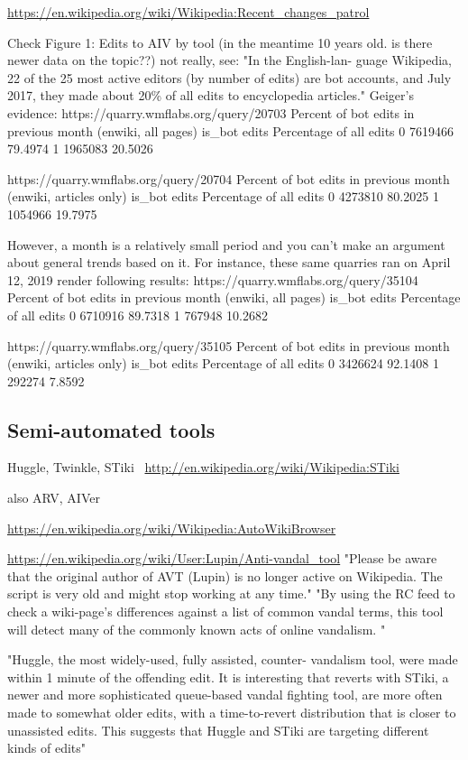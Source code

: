 \url{https://en.wikipedia.org/wiki/Wikipedia:Recent_changes_patrol}

\cite{GeiRib2010}
Check Figure 1: Edits to AIV by tool (in the meantime 10 years old. is there newer data on the topic??)
not really, see:
\cite{Geiger2017}
"In the English-lan-
guage Wikipedia, 22 of the 25 most active editors (by
number of edits) are bot accounts, and July 2017, they
made about 20\% of all edits to encyclopedia articles."
Geiger's evidence:
https://quarry.wmflabs.org/query/20703
Percent of bot edits in previous month (enwiki, all pages)
is_bot	edits	Percentage of all edits
0	    7619466	79.4974
1	    1965083	20.5026

https://quarry.wmflabs.org/query/20704
Percent of bot edits in previous month (enwiki, articles only)
is_bot	edits	Percentage of all edits
0	    4273810	80.2025
1	    1054966	19.7975

However, a month is a relatively small period and you can't make an argument about general trends based on it.
For instance, these same quarries ran on April 12, 2019 render following results:
https://quarry.wmflabs.org/query/35104
Percent of bot edits in previous month (enwiki, all pages)
is_bot	edits	Percentage of all edits
0	    6710916	89.7318
1	    767948	10.2682

https://quarry.wmflabs.org/query/35105
Percent of bot edits in previous month (enwiki, articles only)
is_bot	edits	Percentage of all edits
0	    3426624	92.1408
1	    292274	7.8592

\subsection{Semi-automated tools}


Huggle, Twinkle, STiki~\cite{WestKanLee2010}
\url{http://en.wikipedia.org/wiki/Wikipedia:STiki}

also ARV, AIVer

\url{https://en.wikipedia.org/wiki/Wikipedia:AutoWikiBrowser}

\url{https://en.wikipedia.org/wiki/User:Lupin/Anti-vandal_tool}
"Please be aware that the original author of AVT (Lupin) is no longer active on Wikipedia. The script is very old and might stop working at any time."
"By using the RC feed to check a wiki-page's differences against a list of common vandal terms, this tool will detect many of the commonly known acts of online vandalism. "

\cite{GeiHal2013}
"Huggle, the most widely-used, fully assisted, counter-
vandalism tool, were made within 1 minute of the
offending edit. It is interesting that reverts with STiki, a
newer and more sophisticated queue-based vandal fighting
tool, are more often made to somewhat older edits, with a
time-to-revert distribution that is closer to unassisted edits.
This suggests that Huggle and STiki are targeting different
kinds of edits"

